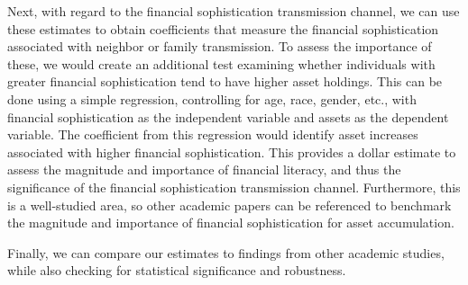 \documentclass[
  12pt]{article}
\begin{document}
Next, with regard to the financial sophistication transmission channel,
we can use these estimates to obtain coefficients that measure the
financial sophistication associated with neighbor or family
transmission. To assess the importance of these, we would create an
additional test examining whether individuals with greater financial
sophistication tend to have higher asset holdings. This can be done
using a simple regression, controlling for age, race, gender, etc., with
financial sophistication as the independent variable and assets as the
dependent variable. The coefficient from this regression would identify
asset increases associated with higher financial sophistication. This
provides a dollar estimate to assess the magnitude and importance of
financial literacy, and thus the significance of the financial
sophistication transmission channel. Furthermore, this is a well-studied
area, so other academic papers can be referenced to benchmark the
magnitude and importance of financial sophistication for asset
accumulation.

Finally, we can compare our estimates to findings from other academic
studies, while also checking for statistical significance and
robustness.
\end{document}
